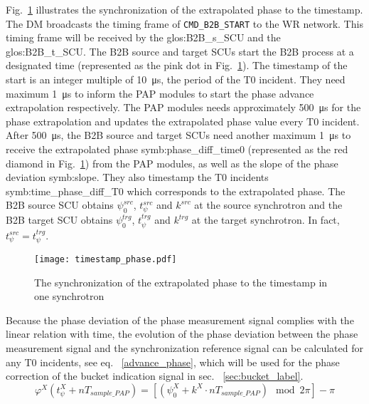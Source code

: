 Fig.~\ref{phase_diff_syn_time} illustrates the synchronization of the extrapolated phase to the timestamp. The DM broadcasts the timing frame of \verb|CMD_B2B_START| to the WR network. This timing frame will be received by the \gls{glos:B2B_s_SCU} and the \gls{glos:B2B_t_SCU}. The B2B source and target SCUs start the B2B process at a designated time (represented as the pink dot in Fig.~\ref{phase_diff_syn_time}). The timestamp of the start is an integer multiple of \SI{10}{\us}, the period of the T0 incident. They need maximum \SI{1}{\us} to inform the PAP modules to start the phase advance extrapolation respectively. The PAP modules needs approximately \SI{500}{\us} for the phase extrapolation and updates the extrapolated phase value every T0 incident. After \SI{500}{\us}, the B2B source and target SCUs need another maximum \SI{1}{\us} to receive the extrapolated phase \gls{symb:phase_diff_time0} (represented as the red diamond in Fig.~\ref{phase_diff_syn_time}) from the PAP modules, as well as the slope of the phase deviation \gls{symb:slope}. They also timestamp the T0 incidents \gls{symb:time_phase_diff_T0} which corresponds to the extrapolated phase. The B2B source SCU obtains $\psi^\mathit{src}_0$, $t_\psi^\mathit{src}$ and $k^\mathit{src}$ at the source synchrotron and the B2B target SCU obtains $\psi^\mathit{trg}_0$, $t_\psi^\mathit{trg}$ and $k^\mathit{trg}$ at the target synchrotron. In fact, $t_\psi^\mathit{src}=t_\psi^\mathit{trg}$.
 \begin{figure}[!htb]
   \centering   
   \texttt{[image: timestamp\_phase.pdf]}
   \caption{The synchronization of the extrapolated phase to the timestamp in one synchrotron}
   \label{phase_diff_syn_time}
\end{figure}

Because the phase deviation of the phase measurement signal complies with the linear relation with time, the evolution of the phase deviation between the phase measurement signal and the synchronization reference signal can be calculated for any T0 incidents, see eq. ~\ref{advance_phase}, which will be used for the phase correction of the bucket indication signal in sec. ~\ref{sec:bucket_label}.
\begin{equation}
\label{advance_phase}
\varphi^\mathit{X}(t_\mathit{\psi}^\mathit{X}+nT_\mathit{sample\_PAP})=[(\psi^\mathit{X}_0+k^\mathit{X}\cdot nT_\mathit{sample\_PAP}) \mod 2\pi] - \pi
\end{equation}

